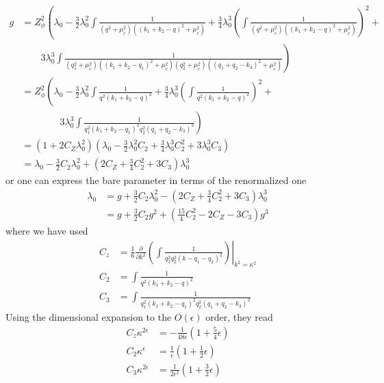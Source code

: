 \documentclass[submission, PhysLectNotes]{SciPost}
\begin{document}
\begin{equation}
	\begin{aligned}
		g &= Z_\phi^2 \left( \lambda_0 - \frac{3}{2}\lambda_0^2 \int \frac{1}{\left(q^2 + \mu_c^2\right)\left(\left(k_1+k_2-q\right)^2 + \mu_c^2\right)} + \frac{3}{4}\lambda_0^3 \left( \int \frac{1}{\left(q^2 + \mu_c^2\right)\left(\left(k_1+k_2-q\right)^2 + \mu_c^2\right)} \right)^2 + \right.\\
		& \left.\qquad 3\lambda_0^3 \int \frac{1}{\left(q_1^2+\mu_c^2\right)\left(\left(k_1+k_2-q_1\right)^2+\mu_c^2\right)\left(q_2^2+\mu_c^2\right)\left(\left(q_1+q_2-k_3\right)^2+\mu_c^2\right)} \right)\\
		&= Z_\phi^2 \left( \lambda_0 - \frac{3}{2}\lambda_0^2 \int \frac{1}{q^2 \left(k_1+k_2-q\right)^2} + \frac{3}{4}\lambda_0^3 \left( \int \frac{1}{q^2 \left(k_1+k_2-q\right)^2} \right)^2 + \right.\\
		& \left.\qquad \qquad 3\lambda_0^3 \int \frac{1}{q_1^2 \left(k_1+k_2-q_1\right)^2 q_2^2 \left(q_1+q_2-k_3\right)^2} \right)\\
		&=\left(1 + 2 C_Z \lambda_0^2\right) \left( \lambda_0 - \frac{3}{2}\lambda_0^2 C_2 + \frac{3}{4}\lambda_0^3 C_2^2 + 3\lambda_0^3 C_3 \right)\\
		&=\lambda_0 - \frac{3}{2} C_2 \lambda_0^2 + \left(2 C_Z + \frac{3}{4} C_2^2 + 3 C_3\right) \lambda_0^3
	\end{aligned}
\end{equation} 
or one can express the bare parameter in terms of the renormalized one
\begin{equation}
	\begin{aligned}
		\lambda_0 &= g + \frac{3}{2} C_2 \lambda_0^2 - \left(2 C_Z + \frac{3}{4} C_2^2 + 3 C_3\right) \lambda_0^3 \\
		&=g + \frac{3}{2} C_2 g^2 + \left(\frac{15}{4} C_2^2 - 2 C_Z - 3 C_3\right) g^3
	\end{aligned}
\end{equation}
where we have used 
\begin{equation}
	\begin{aligned}
		C_z &= \frac{1}{6}\left.\frac{\partial}{\partial k^2} \left( \int \frac{1}{ q_1^2 q_2^2 \left(k - q_1-q_2\right)^2 } \right) \right\vert_{k^2=\kappa^2} \\
		C_2 &= \int \frac{1}{q^2 \left(k_1+k_2-q\right)^2} \\
		C_3 &= \int \frac{1}{q_1^2 \left(k_1+k_2-q_1\right)^2 q_2^2 \left(q_1+q_2-k_3\right)^2}
	\end{aligned}
\end{equation}
Using the dimensional expansion to the $O(\epsilon)$ order, they read
\begin{equation}
	\begin{aligned}
		C_z \kappa^{2 \epsilon} &= -\frac{1}{48\epsilon}\left(1+\frac{5}{4}\epsilon\right) \\
		C_2 \kappa^\epsilon &= \frac{1}{\epsilon} \left(1+\frac{1}{2}\epsilon\right) \\
		C_3 \kappa^{2 \epsilon} &= \frac{1}{2 \epsilon ^2} \left(1+\frac{3}{2}\epsilon\right)
	\end{aligned}
\end{equation}
\end{document}
